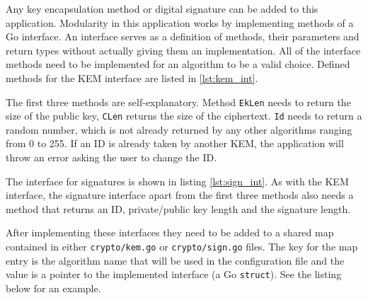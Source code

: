 Any key encapsulation method or digital signature can be added to this application. Modularity in this application works by implementing methods of a Go interface. An interface serves as a definition of methods, their parameters and return types without actually giving them an implementation. All of the interface methods need to be implemented for an algorithm to be a valid choice. Defined methods for the KEM interface are listed in \ref{lst:kem_int}.

The first three methods are self-explanatory. Method \texttt{EkLen} needs to return the size of the public key, \texttt{CLen} returns the size of the ciphertext. \texttt{Id} needs to return a random number, which is not already returned by any other algorithms ranging from 0 to 255. If an ID is already taken by another KEM, the application will throw an error asking the user to change the ID.

The interface for signatures is shown in listing \ref{lst:sign_int}. As with the KEM interface, the signature interface apart from the first three methods also needs a method that returns an ID, private/public key length and the signature length.

After implementing these interfaces they need to be added to a shared map contained in either \texttt{crypto/kem.go} or \texttt{crypto/sign.go} files. The key for the map entry is the algorithm name that will be used in the configuration file and the value is a pointer to the implemented interface (a Go \texttt{struct}). See the listing below for an example.
